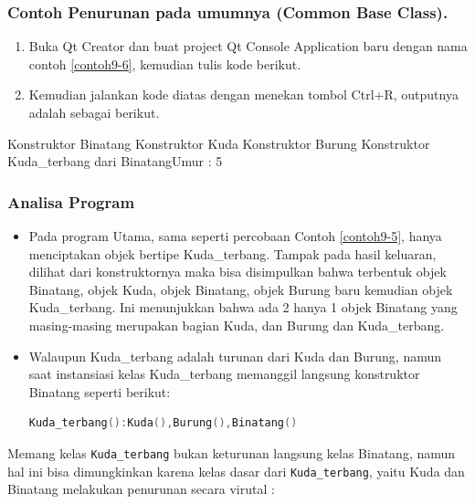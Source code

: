 \subsubsection*{Contoh  Penurunan pada umumnya (Common Base Class).}

\begin{enumerate}

\item
  Buka Qt Creator dan buat project Qt Console Application baru dengan
  nama contoh \ref{contoh9-6}, kemudian tulis kode berikut.




\item
  Kemudian jalankan kode diatas dengan menekan tombol Ctrl+R, outputnya
  adalah sebagai berikut.
\end{enumerate}
\begin{lcverbatim}
Konstruktor Binatang
Konstruktor Kuda 
Konstruktor Burung
Konstruktor Kuda_terbang dari
BinatangUmur : 5
\end{lcverbatim}


\subsubsection*{Analisa Program}

\begin{itemize}
\item
  Pada program Utama, sama seperti percobaan Contoh \ref{contoh9-5}, hanya menciptakan
  objek bertipe Kuda\_terbang. Tampak pada hasil keluaran, dilihat dari
  konstruktornya maka bisa disimpulkan bahwa terbentuk objek Binatang,
  objek Kuda, objek Binatang, objek Burung baru kemudian objek
  Kuda\_terbang. Ini menunjukkan bahwa ada 2 hanya 1 objek Binatang yang
  masing-masing merupakan bagian Kuda, dan Burung dan Kuda\_terbang.
\item
  Walaupun Kuda\_terbang adalah turunan dari Kuda dan Burung, namun saat
  instansiasi kelas Kuda\_terbang memanggil langsung konstruktor
  Binatang seperti berikut:

\begin{lstlisting}[language=c++, numbers=none]
Kuda_terbang():Kuda(),Burung(),Binatang()
\end{lstlisting}
\end{itemize}

Memang kelas \texttt{Kuda\_terbang} bukan keturunan langsung kelas
Binatang, namun hal ini bisa dimungkinkan karena kelas dasar dari
\texttt{Kuda\_terbang}, yaitu Kuda dan Binatang melakukan penurunan
secara virutal :

